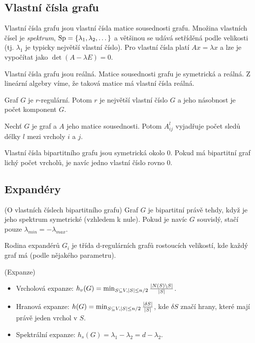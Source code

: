 
\subsection{Vlastní čísla grafu}

\df Vlastní čísla grafu jsou vlastní čísla matice sousednosti grafu. Množina
vlastních čísel je {\it spektrum}, $\operatorname{Sp} = \{\lambda_1, \lambda_2, \dots\}$ a
většinou se udává setříděná podle velikosti (tj. $\lambda_1$ je typicky
největší vlastní číslo). Pro vlastní čísla platí $Ax = \lambda x$ a lze je
vypočítat jako $\det(A - \lambda E) = 0$.

\vt Vlastní čísla grafu jsou reálná.
\dk Matice sousednosti grafu je symetrická a reálná. Z lineární algebry víme, že
taková matice má vlastní čísla reálná.

\vt Graf $G$ je $r$-regulární. Potom $r$ je největší vlastní číslo $G$ a jeho
násobnost je počet komponent $G$.

\vt Nechť $G$ je graf a $A$ jeho matice sousednosti. Potom $A^l_{ij}$ vyjadřuje
počet sledů délky $l$ mezi vrcholy $i$ a $j$.

\vt Vlastní čísla bipartitního grafu jsou symetrická okolo $0$. Pokud má
bipartitní graf lichý počet vrcholů, je navíc jedno vlastní číslo rovno $0$.

\subsection{Expandéry}

\vt (O vlastních číslech bipartitního grafu) Graf $G$ je bipartitní právě
tehdy, když je jeho spektrum symetrické (vzhledem k nule). Pokud je navíc $G$
souvislý, stačí pouze $\lambda_{min} = -\lambda_{max}$.

\df Rodina expandérů $G_i$ je třída d-regulárních grafů rostoucích velikostí,
kde každý graf má  (podle nějakého parametru).

\df (Expanze) \begin{itemize}
	\item Vrcholová expanze: $h_v(G) = \min_{S\subseteq V, |S|\leq n/2}
	{|N(S)\setminus S| \over |S|}$.
	\item Hranová expanze: $h(G) = \min_{S\subseteq V, |S|\leq n/2} {|\delta S|
	\over |S|}$, kde $\delta S$ značí hrany, které mají právě jeden vrchol v
	$S$.
	\item Spektrální expanze: $h_s(G) = \lambda_1 - \lambda_2 = d - \lambda_2$.
\end{itemize}

